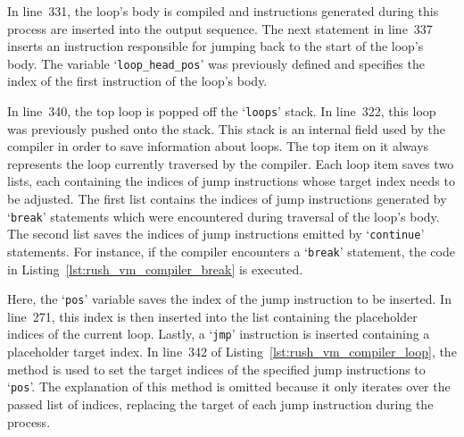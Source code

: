In line~331, the loop's body is compiled and instructions generated during this process are inserted into the output sequence.
The next statement in line~337 inserts an instruction responsible for jumping back to the start of the loop's body.
The variable `\texttt{loop\_head\_pos}' was previously defined and specifies the index of the first instruction of the loop's body.

In line~340, the top loop is popped off the `\texttt{loops}' stack.
In line~322, this loop was previously pushed onto the  stack.
This stack is an internal field used by the compiler in order to save information about loops.
The top item on it always represents the loop currently traversed by the compiler.
Each loop item saves two lists, each containing the indices of jump instructions whose target index needs to be adjusted.
The first list contains the indices of jump instructions generated by `\texttt{break}' statements which were encountered during traversal of the loop's body.
The second list saves the indices of jump instructions emitted by `\texttt{continue}' statements.
For instance, if the compiler encounters a `\texttt{break}' statement, the code in Listing~\ref{lst:rush_vm_compiler_break} is executed.


Here, the `\texttt{pos}' variable saves the index of the jump instruction to be inserted.
In line~271, this index is then inserted into the list containing the placeholder indices of the current loop.
Lastly, a `\texttt{jmp}' instruction is inserted containing a placeholder target index.
In line~342 of Listing~\ref{lst:rush_vm_compiler_loop}, the  method is used to set the target indices of the specified jump instructions to `\texttt{pos}'.
The explanation of this method is omitted because it only iterates over the passed list of indices, replacing the target of each jump instruction during the process.
